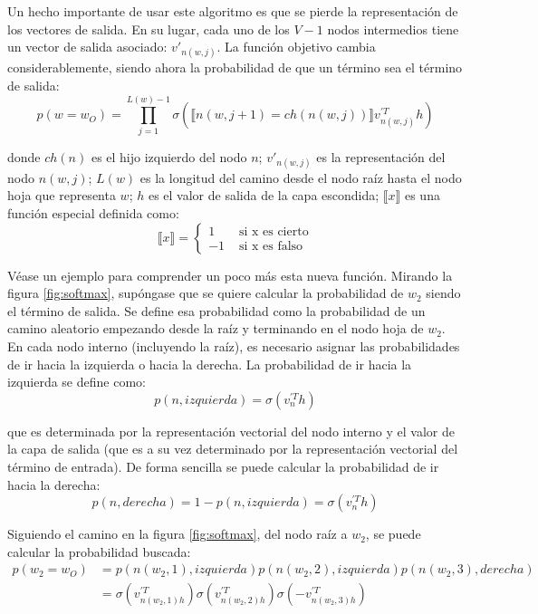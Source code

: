 Un hecho importante de usar este algoritmo es que se pierde la representación de los vectores de salida. En su lugar, cada uno de los $V-1$ nodos intermedios tiene un vector de salida asociado:
$v'_{n(w,j)}$. La función objetivo cambia considerablemente, siendo ahora la probabilidad de que un término sea el término de salida:
\begin{equation}\label{eq:soft}
  p\left( w=w_O \right) = \prod_{j=1}^{L(w)-1}\sigma\left( \llbracket n(w, j+1)=ch(n(w,j))\rrbracket v^{'T}_{n(w,j)}h \right)
\end{equation}

donde $ch(n)$ es el hijo izquierdo del nodo $n$; $v'_{n(w,j)}$ es la representación del nodo $n(w,j)$; $L(w)$ es la longitud del camino desde el nodo raíz hasta el nodo hoja que representa $w$; $h$ es el valor de salida de la capa escondida; $\llbracket x\rrbracket$ es una función especial
definida como:
\begin{equation}
  \llbracket x \rrbracket = \begin{cases}
    1 & \text{ si x es cierto} \\
    -1 & \text{ si x es falso}
  \end{cases}
\end{equation}

Véase un ejemplo para comprender un poco más esta nueva función. Mirando la figura \ref{fig:softmax}, supóngase que se quiere calcular la probabilidad de $w_2$ siendo el término de salida. Se define esa
probabilidad como la probabilidad de un camino aleatorio empezando desde la raíz y terminando en el nodo hoja de $w_2$. En cada nodo interno (incluyendo la raíz), es necesario asignar las probabilidades
de ir hacia la izquierda o hacia la derecha. La probabilidad de ir hacia la izquierda se define como:
\begin{equation}
  p\left( n, izquierda \right) = \sigma\left( v^{'T}_n h \right)
\end{equation}

que es determinada por la representación vectorial del nodo interno y el valor de la capa de salida (que es a su vez determinado por la representación vectorial del término de entrada). De forma sencilla
se puede calcular la probabilidad de ir hacia la derecha:
\begin{equation}
  p\left( n, derecha \right) = 1 - p\left( n, izquierda \right) = \sigma\left( v^{'T}_n h \right)
\end{equation}

Siguiendo el camino en la figura \ref{fig:softmax}, del nodo raíz a $w_2$, se puede calcular la probabilidad buscada:
\begin{align}
  p\left( w_2 = w_O \right) & = p\left( n(w_2, 1), izquierda \right) p\left( n(w_2, 2), izquierda \right) p\left(n(w_2, 3), derecha\right)\\
                            & = \sigma\left( v^{'T}_{n(w_2, 1)h} \right) \sigma\left( v^{'T}_{n(w_2, 2)h} \right) \sigma\left( - v^{'T}_{n(w_2, 3)h} \right)
\end{align}

